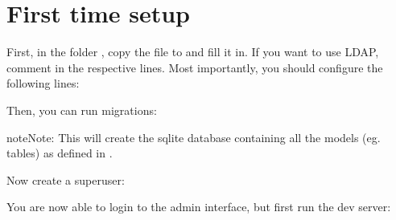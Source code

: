 \documentclass[letterpaper,10pt,openany,oneside,english]{sphinxmanual}
\begin{document}
\section{First time setup}
\label{\detokenize{index:first-time-setup}}
First, in the folder , copy the file 
to  and fill it in. If you want to use LDAP, comment in
the respective lines. Most importantly, you should configure the following lines:

%
\begin{sphinxVerbatim}[commandchars=\\\{\}]
  
  
  \PYG{p}{[} \PYG{p}{]}
\end{sphinxVerbatim}

Then, you can run migrations:

%
\begin{sphinxVerbatim}[commandchars=\\\{\}]
  
\end{sphinxVerbatim}

\begin{sphinxadmonition}{note}{Note:}
This will create the sqlite database  containing all the models
(eg. tables) as defined in .
\end{sphinxadmonition}

Now create a superuser:

%
\begin{sphinxVerbatim}[commandchars=\\\{\}]
  
\end{sphinxVerbatim}

You are now able to login to the admin interface, but first run the dev server:

%
\begin{sphinxVerbatim}[commandchars=\\\{\}]
  
\end{sphinxVerbatim}
\end{document}
